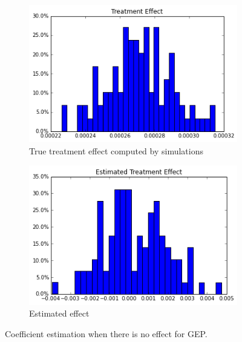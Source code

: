 \documentclass[11pt]{article}
\begin{document}
\begin{figure}[h]
\centering
\begin{subfigure}{.5\textwidth}
  \centering
  \includegraphics[width=.9\linewidth]{treatment_effect_no_influence.png}
  \caption{True treatment effect computed by simulations}
  \label{fig:sub1}
\end{subfigure}%
\begin{subfigure}{.5\textwidth}
  \centering
  \includegraphics[width=.9\linewidth]{estimated_no_influence.png}
  \caption{Estimated effect}
  \label{fig:sub2}
\end{subfigure}
\caption{Coefficient estimation when there is no effect for GEP.}
\label{fig:small_effect_gep}
\end{figure}
\end{document}
